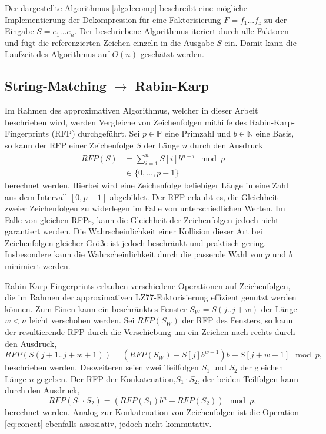 Der dargestellte Algorithmus \ref{alg:decomp} beschreibt eine mögliche Implementierung der Dekompression für eine Faktorisierung $F=f_1...f_z$ zu der Eingabe $S=e_1...e_n$.
Der beschriebene Algorithmus iteriert durch alle Faktoren und fügt die referenzierten Zeichen einzeln in die Ausgabe $S$ ein. Damit kann die Laufzeit des Algorithmus auf $O(n)$
geschätzt werden.

\subsection{String-Matching $\rightarrow$ Rabin-Karp}
Im Rahmen des approximativen Algorithmus, welcher in dieser Arbeit beschrieben wird, werden Vergleiche von Zeichenfolgen mithilfe des Rabin-Karp-Fingerprints (RFP) \cite{rfp}
durchgeführt. Sei
$p\in \mathbb{P}$ eine Primzahl und $b\in \mathbb{N}$ eine Basis, so kann der RFP einer Zeichenfolge $S$ der Länge $n$ durch den Ausdruck
\begin{equation}
    \begin{split}
    RFP(S) &= \sum_{i=1}^{n} S[i]b^{n-i} \mod p \\
    &\in \{0,...,p-1\}
    \end{split}
\end{equation}
berechnet werden. Hierbei wird eine Zeichenfolge beliebiger Länge in eine Zahl aus dem Intervall $[0,p-1]$ abgebildet. Der RFP erlaubt es, die Gleichheit zweier Zeichenfolgen zu widerlegen
im Falle von unterschiedlichen Werten. Im Falle von gleichen RFPs, kann die Gleichheit der Zeichenfolgen jedoch nicht garantiert werden. Die Wahrscheinlichkeit einer Kollision 
dieser Art bei Zeichenfolgen gleicher Größe ist jedoch beschränkt und praktisch gering. Insbesondere kann die Wahrscheinlichkeit durch die passende Wahl von $p$ und $b$ 
minimiert werden.

Rabin-Karp-Fingerprints erlauben verschiedene Operationen auf Zeichenfolgen, die im Rahmen der approximativen LZ77-Faktorisierung effizient genutzt werden können. Zum Einen kann ein
beschränktes Fenster $S_{W} = S(j..j+w)$ der Länge $w<n$ leicht verschoben werden. Sei $RFP(S_{W})$ der RFP des Fensters, so kann der resultierende RFP durch die Verschiebung um 
ein Zeichen nach rechts durch den Ausdruck,
\begin{equation} \label{eq:shift}
    RFP(S(j+1..j+w+1)) = (RFP(S_W) - S[j]b^{w-1})b + S[j+w+1] \mod p,
\end{equation}
beschrieben werden. Desweiteren seien zwei Teilfolgen $S_1$ und $S_2$ der gleichen Länge $n$ gegeben. Der RFP der Konkatenation,$S_1\cdot S_2$, der beiden Teilfolgen kann durch den Ausdruck,
\begin{equation} \label{eq:concat}
    RFP(S_1\cdot S_2) = (RFP(S_1)b^n + RFP(S_2)) \mod p,
\end{equation}
berechnet werden. Analog zur Konkatenation von Zeichenfolgen ist die Operation \ref{eq:concat} ebenfalls assoziativ, jedoch nicht kommutativ.

